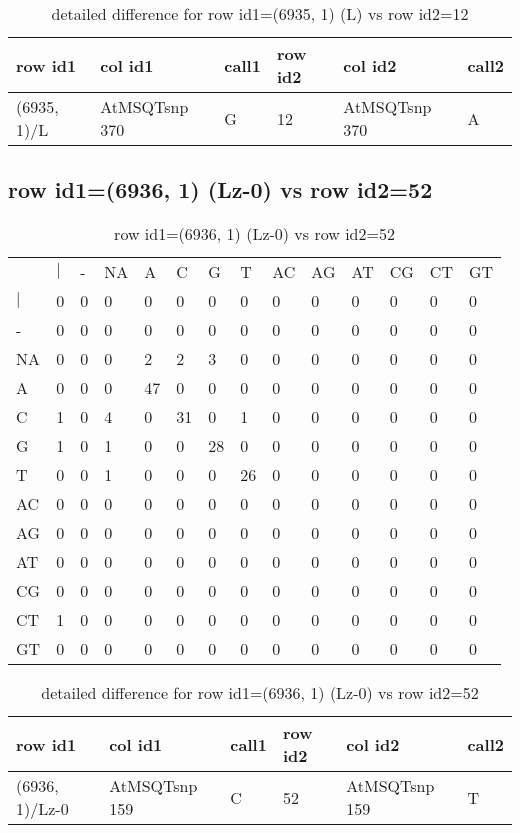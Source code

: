 \begin{center}
\begin{longtable}{|l|l|l|l|l|l|}
\caption{detailed difference for row id1=(6935, 1) (L) vs row id2=12} \label{table_dm133}\\
\hline
row id1&col id1&call1&row id2&col id2&call2\\
\hline
(6935, 1)/L&AtMSQTsnp 370&G&12&AtMSQTsnp 370&A\\
\hline
\end{longtable}
\end{center}

\subsection{row id1=(6936, 1) (Lz-0) vs row id2=52}
\begin{center}
\begin{longtable}{|l|l|l|l|l|l|l|l|l|l|l|l|l|l|}
\caption{row id1=(6936, 1) (Lz-0) vs row id2=52} \label{table_dm134}\\
\hline
\\
\hline
&$|$&-&NA&A&C&G&T&AC&AG&AT&CG&CT&GT\\
$|$&0&0&0&0&0&0&0&0&0&0&0&0&0\\
-&0&0&0&0&0&0&0&0&0&0&0&0&0\\
NA&0&0&0&2&2&3&0&0&0&0&0&0&0\\
A&0&0&0&47&0&0&0&0&0&0&0&0&0\\
C&1&0&4&0&31&0&1&0&0&0&0&0&0\\
G&1&0&1&0&0&28&0&0&0&0&0&0&0\\
T&0&0&1&0&0&0&26&0&0&0&0&0&0\\
AC&0&0&0&0&0&0&0&0&0&0&0&0&0\\
AG&0&0&0&0&0&0&0&0&0&0&0&0&0\\
AT&0&0&0&0&0&0&0&0&0&0&0&0&0\\
CG&0&0&0&0&0&0&0&0&0&0&0&0&0\\
CT&1&0&0&0&0&0&0&0&0&0&0&0&0\\
GT&0&0&0&0&0&0&0&0&0&0&0&0&0\\
\hline
\end{longtable}
\end{center}

\begin{center}
\begin{longtable}{|l|l|l|l|l|l|}
\caption{detailed difference for row id1=(6936, 1) (Lz-0) vs row id2=52} \label{table_dm135}\\
\hline
row id1&col id1&call1&row id2&col id2&call2\\
\hline
(6936, 1)/Lz-0&AtMSQTsnp 159&C&52&AtMSQTsnp 159&T\\
\hline
\end{longtable}
\end{center}

